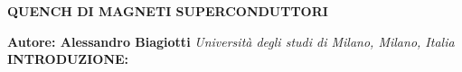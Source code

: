 \documentclass[a4paper,10pt]{article}
\begin{document}
\noindent
\begin{center}
	\textbf{{\Large QUENCH DI MAGNETI SUPERCONDUTTORI}} \\
\end{center}

\noindent
\textbf{Autore: Alessandro Biagiotti} \textit{Università degli studi di Milano, Milano, Italia}
\\

\noindent
\textbf{INTRODUZIONE:}
\\



\clearpage
\end{document}
